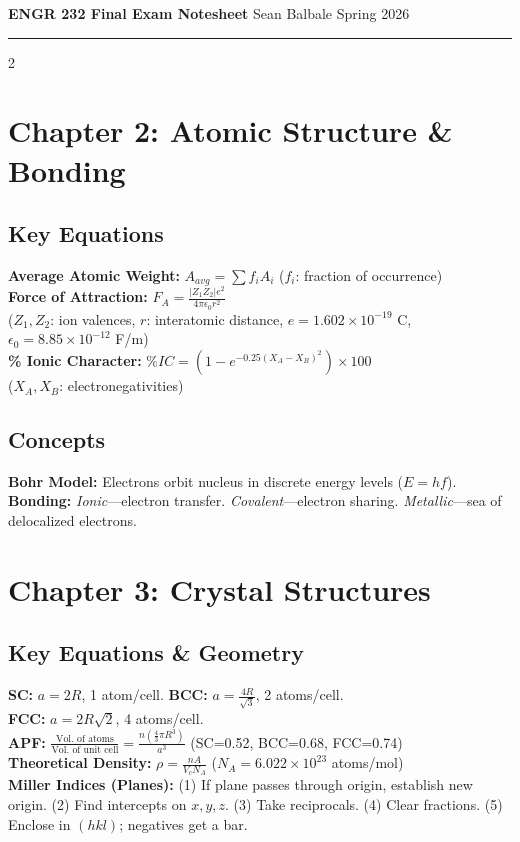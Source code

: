 \documentclass[8pt]{extarticle}
\date{}
\begin{document}
\normalsize \textbf{ENGR 232 Final Exam Notesheet} \hfill Sean Balbale \hfill Spring 2026 \vspace{0.03cm}
\hrule
\vspace{0.03cm}
\begin{multicols*}{2}

\section*{Chapter 2: Atomic Structure \& Bonding}
\subsection*{Key Equations}
\textbf{Average Atomic Weight:} $A_{avg} = \sum f_i A_i$ \quad ($f_i$: fraction of occurrence) \\
\textbf{Force of Attraction:} $F_A = \frac{|Z_1 Z_2| e^2}{4\pi\epsilon_0 r^2}$ \\
($Z_1,Z_2$: ion valences, $r$: interatomic distance, $e=1.602\times10^{-19}$ C, $\epsilon_0=8.85\times10^{-12}$ F/m) \\
\textbf{\% Ionic Character:} $\%IC = \left(1-e^{-0.25(X_A-X_B)^2}\right)\times 100$ \\
($X_A, X_B$: electronegativities)
\subsection*{Concepts}
\textbf{Bohr Model:} Electrons orbit nucleus in discrete energy levels ($E=hf$). \\
\textbf{Bonding:} \textit{Ionic}—electron transfer. \textit{Covalent}—electron sharing. \textit{Metallic}—sea of delocalized electrons.

\section*{Chapter 3: Crystal Structures}
\subsection*{Key Equations \& Geometry}
\textbf{SC:} $a=2R$, 1 atom/cell. \quad \textbf{BCC:} $a=\frac{4R}{\sqrt{3}}$, 2 atoms/cell. \\
\textbf{FCC:} $a=2R\sqrt{2}$, 4 atoms/cell. \\
\textbf{APF:} $\frac{\text{Vol. of atoms}}{\text{Vol. of unit cell}} = \frac{n(\frac{4}{3}\pi R^3)}{a^3}$ \quad (SC=0.52, BCC=0.68, FCC=0.74) \\
\textbf{Theoretical Density:} $\rho = \frac{nA}{V_c N_A}$ \quad ($N_A=6.022\times10^{23}$ atoms/mol) \\
\textbf{Miller Indices (Planes):} (1) If plane passes through origin, establish new origin. (2) Find intercepts on $x,y,z$. (3) Take reciprocals. (4) Clear fractions. (5) Enclose in $(hkl)$; negatives get a bar.

\end{multicols*}
\end{document}
